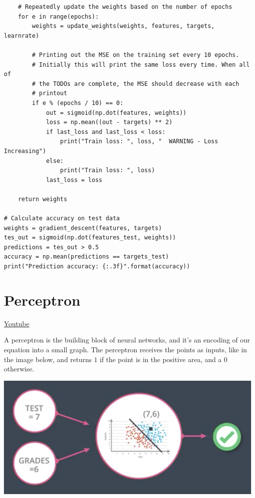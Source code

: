 \begin{lstlisting}
    # Repeatedly update the weights based on the number of epochs
    for e in range(epochs):
        weights = update_weights(weights, features, targets, learnrate)

        # Printing out the MSE on the training set every 10 epochs.
        # Initially this will print the same loss every time. When all of
        # the TODOs are complete, the MSE should decrease with each
        # printout
        if e % (epochs / 10) == 0:
            out = sigmoid(np.dot(features, weights))
            loss = np.mean((out - targets) ** 2)
            if last_loss and last_loss < loss:
                print("Train loss: ", loss, "  WARNING - Loss Increasing")
            else:
                print("Train loss: ", loss)
            last_loss = loss
            
    return weights

# Calculate accuracy on test data
weights = gradient_descent(features, targets)
tes_out = sigmoid(np.dot(features_test, weights))
predictions = tes_out > 0.5
accuracy = np.mean(predictions == targets_test)
print("Prediction accuracy: {:.3f}".format(accuracy))
\end{lstlisting}

\section{Perceptron}
\href{https://www.youtube.com/watch?v=O3JyyRSMHAQ&t=72s&ab_channel=Udacity}{Youtube}\newline

A perceptron is the building block of neural networks, and it's an encoding of our equation into a small graph. The perceptron receives the points as inputs, like in the image below, and returns \(1\) if the point is in the positive area, and a \(0\) otherwise.

\includegraphics[width=1\linewidth]{img//intro/perceptron-4.png}

